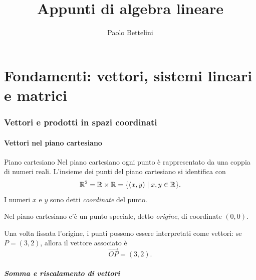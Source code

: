 \documentclass[a4paper]{article}
\title{Appunti di algebra lineare}
\author{Paolo Bettelini}
\date{}
\begin{document}
\setcounter{tocdepth}{3}
\setcounter{secnumdepth}{3}

\maketitle
\tableofcontents

\part{Fondamenti: vettori, sistemi lineari e matrici}

\section{Vettori e prodotti in spazi coordinati}

\subsection{Vettori nel piano cartesiano}

\begin{snippetdefinition}{Piano cartesiano}
    Nel piano cartesiano ogni punto è rappresentato da una coppia di numeri reali. L'insieme dei punti del piano cartesiano si identifica con
    \[
        \mathbb{R}^2 = \mathbb{R} \times \mathbb{R}
        = \{(x,y) \mid x,y \in \mathbb{R}\}.
    \]
    I numeri \(x\) e \(y\) sono detti \emph{coordinate} del punto.

    Nel piano cartesiano c'è un punto speciale, detto \emph{origine}, di coordinate \((0,0)\).
\end{snippetdefinition}

Una volta fissata l'origine, i punti possono essere interpretati come vettori: se \(P=(3,2)\), allora il vettore associato è
\[
    \overrightarrow{OP} = (3,2).
\]

\begin{center}
\end{center}

\subsubsection{Somma e riscalamento di vettori}
\end{document}
